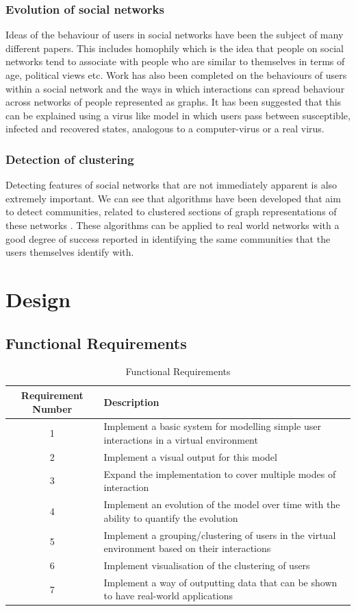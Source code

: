 \documentclass[12pt,a4paper]{article}
\begin{document}
\subsubsection{Evolution of social networks}
Ideas of the behaviour of users in social networks have been the subject of many different papers. This includes homophily \cite{adamic2003social} which is the idea that people on social networks tend to associate with people who are similar to themselves in terms of age, political views etc. Work has also been completed on the behaviours of users within a social network and the ways in which interactions can spread behaviour across networks of people represented as graphs. It has been suggested that this can be explained using a virus like model \cite{centola2010spread} in which users pass between susceptible, infected and recovered states, analogous to a computer-virus or a real virus.

\subsubsection{Detection of clustering}
Detecting features of social networks that are not immediately apparent is also extremely important. We can see that algorithms have been developed that aim to detect communities, related to clustered sections of graph representations of these networks \cite{newman2004fast}. These algorithms can be applied to real world networks with a good degree of success reported in identifying the same communities that the users themselves identify with.

\section{Design}

\subsection{Functional Requirements}

\begin{table}[htb]
\centering
\caption{Functional Requirements}
\vspace*{6pt}
\label{tab:requirements}
\begin{tabular}{c p{11cm}}\hline\hline
Requirement Number & Description \\ \hline
1 & Implement a basic system for modelling simple user interactions in a virtual environment \\
2 & Implement a visual output for this model \\
3 & Expand the implementation to cover multiple modes of interaction \\
4 & Implement an evolution of the model over time with the ability to quantify the evolution \\
5 & Implement a grouping/clustering of users in the virtual environment based on their interactions \\
6 & Implement visualisation of the clustering of users \\
7 & Implement  a way of outputting data that can be shown to have real-world applications
\end{tabular}
\end{table}
\end{document}
